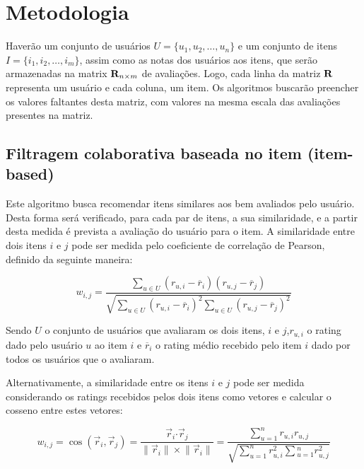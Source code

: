 \documentclass[12pt,a4paper,header]{abnt}
\begin{document}
\section{Metodologia}

Haverão um conjunto de usuários $U = \{u_1, u_2, \ldots, u_n\}$ e um conjunto de itens $I = \{i_1, i_2, \ldots, i_m \}$, assim como as notas dos usuários aos itens, que serão armazenadas na matrix $\bold{R}_{n \times m}$ de avaliações\cite{hahsler2015recommenderlab}. Logo, cada linha da matriz $\bold{R}$ representa um usuário e cada coluna, um item. Os algoritmos buscarão preencher os valores faltantes desta matriz, com valores na mesma escala das avaliações presentes na matriz\cite{takahashi2015estudo}.

\subsection{Filtragem colaborativa baseada no item (item-based)}

Este algoritmo busca recomendar itens similares aos bem avaliados pelo usuário. Desta forma será verificado, para cada par de itens, a sua similaridade, e a partir desta medida é prevista a avaliação do usuário para o item. A similaridade entre dois itens $i$ e $j$ pode ser medida pelo coeficiente de correlação de Pearson, definido da seguinte maneira\cite{melville2011recommender}:

\begin{equation}
w_{i, j} = \frac{\sum_{u \in U}{(r_{u, i} - \overline{r}_i ) ( r_{u, j} - \overline{r}_j )}}{\sqrt{\sum_{u \in U}{(r_{u, i} - \overline{r}_i )^2} \sum_{u \in U}{(r_{u, j} - \overline{r}_j )^2}}}
\end{equation}

Sendo $U$ o conjunto de usuários que avaliaram os dois itens, $i$ e $j$,$r_{u, i}$ o rating dado pelo usuário $u$ ao item $i$ e $\overline{r}_i$ o rating médio recebido pelo item $i$ dado por todos os usuários que o avaliaram.

Alternativamente, a similaridade entre os itens $i$ e $j$ pode ser medida considerando os ratings recebidos pelos dois itens como vetores e calcular o cosseno entre estes vetores\cite{sarwar2001item}:

\begin{equation}
w_{i, j} = \cos({\vec{r}_i, \vec{r}_j}) = \frac{\vec{r}_i \boldsymbol{\cdot} \vec{r}_j}{\lVert \vec{r}_i\rVert \times \lVert \vec{r}_i\rVert} = \frac{\sum_{u=1}^{n}{r_{u, i} r_{u, j}}}{\sqrt{\sum_{u=1}^{n}{r^2_{u, i}} \sum{_{u=1}^{n}{r^2_{u, j}}}}}
\end{equation}
\end{document}
